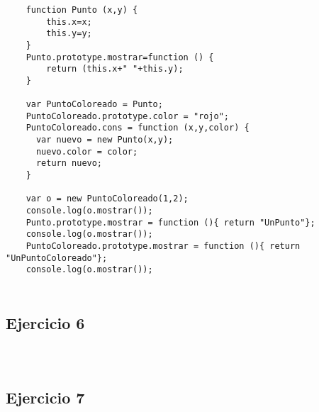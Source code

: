 \documentclass[10pt,a4paper]{article}
\begin{document}
\subsubsection{}
    \begin{lstlisting}
    function Punto (x,y) {
    	this.x=x;
    	this.y=y;
    }
    Punto.prototype.mostrar=function () {
    	return (this.x+" "+this.y);
    }
    
    var PuntoColoreado = Punto;
    PuntoColoreado.prototype.color = "rojo";
    PuntoColoreado.cons = function (x,y,color) {
      var nuevo = new Punto(x,y);
      nuevo.color = color;
      return nuevo;
    }

    var o = new PuntoColoreado(1,2);
    console.log(o.mostrar());
    Punto.prototype.mostrar = function (){ return "UnPunto"};
    console.log(o.mostrar());
    PuntoColoreado.prototype.mostrar = function (){ return "UnPuntoColoreado"};
    console.log(o.mostrar());
    \end{lstlisting}
\subsubsection{}
    \begin{lstlisting}
    \end{lstlisting}
\subsection{Ejercicio 6}
\subsubsection{}
    \begin{lstlisting}
    \end{lstlisting}
\subsubsection{}
    \begin{lstlisting}
    \end{lstlisting}
\subsection{Ejercicio 7}
\subsubsection{}
    \begin{lstlisting}
    \end{lstlisting}
\subsubsection{}
    \begin{lstlisting}
    \end{lstlisting}
\end{document}
